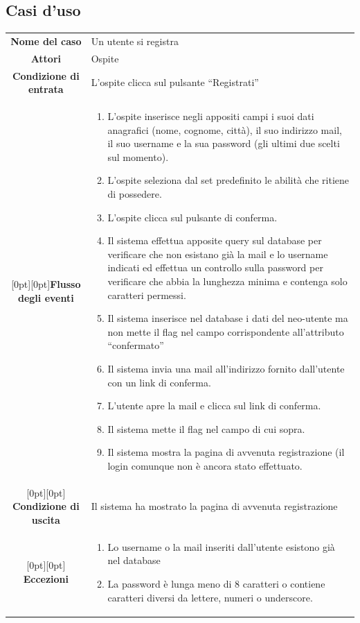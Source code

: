 \documentclass[a4paper,12pt]{article}
\begin{document}
\subsection{Casi d'uso}
\setlength\arrayrulewidth{0.8mm}
\begin{tabularx}{\textwidth}{|c|X|}
\rowcolor[gray]{.9}\hline \textbf{Nome del caso} & Un utente si registra \\ 
\rowcolor[gray]{.9}\hline \textbf{Attori} & Ospite \\ 
\rowcolor[gray]{.9}\hline \textbf{Condizione di entrata} & L'ospite clicca sul pulsante “Registrati” \\ 
\rowcolor[gray]{.9}\hline\raisebox{-27ex}[0pt][0pt]{\textbf{Flusso degli eventi}}& 
\begin{enumerate}
\itemsep0em 
\item L'ospite inserisce negli appositi campi i suoi dati anagrafici (nome, cognome, città), il suo indirizzo mail, il suo username e la sua password (gli ultimi due scelti sul momento).
\item L'ospite seleziona dal set predefinito le abilità che ritiene di possedere.
\item L'ospite clicca sul pulsante di conferma.
\item Il sistema effettua apposite query sul database per verificare che non esistano già la mail e lo username indicati ed effettua un controllo sulla password per verificare che abbia la lunghezza minima e contenga solo caratteri permessi.
\item Il sistema inserisce nel database i dati del neo-utente ma non mette il flag nel campo corrispondente all'attributo “confermato”
\item Il sistema invia una mail all'indirizzo fornito dall'utente con un link di conferma.
\item L'utente apre la mail e clicca sul link di conferma.
\item Il sistema mette il flag nel campo di cui sopra.
\item Il sistema mostra la pagina di avvenuta registrazione (il login comunque non è ancora stato effettuato.
\end{enumerate}
 \\ 
\rowcolor[gray]{.85}\hline\raisebox{-1ex}[0pt][0pt]{ \textbf{Condizione di uscita}} & Il sistema ha mostrato la pagina di avvenuta registrazione \\
\rowcolor[gray]{.85}\hline\raisebox{-6ex}[0pt][0pt] {\textbf{Eccezioni}} & 
\begin{enumerate}
\itemsep0em 
\item Lo username o la mail inseriti dall'utente esistono già nel database
\item La password è lunga meno di 8 caratteri o contiene caratteri diversi da lettere, numeri o underscore.
\end{enumerate}
\\
\hline 
\end{tabularx}
\end{document}
